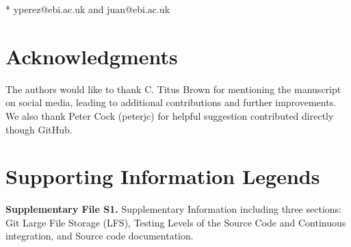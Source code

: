 \documentclass[10pt,letterpaper]{article}
\begin{document}
\begin{flushleft}
\bigskip

* yperez@ebi.ac.uk and juan@ebi.ac.uk

\end{flushleft}




\linenumbers



\section*{Acknowledgments}

The authors would like to thank C. Titus Brown for mentioning
the manuscript on social media, leading to additional contributions
and further improvements. We also thank Peter Cock (peterjc) for
helpful suggestion contributed directly though GitHub.

\nolinenumbers

 

\section*{Supporting Information Legends}

\textbf{Supplementary File S1.} Supplementary Information including
three sections: Git Large File Storage (LFS), Testing Levels of the
Source Code and Continuous integration, and Source code documentation.
\end{document}
